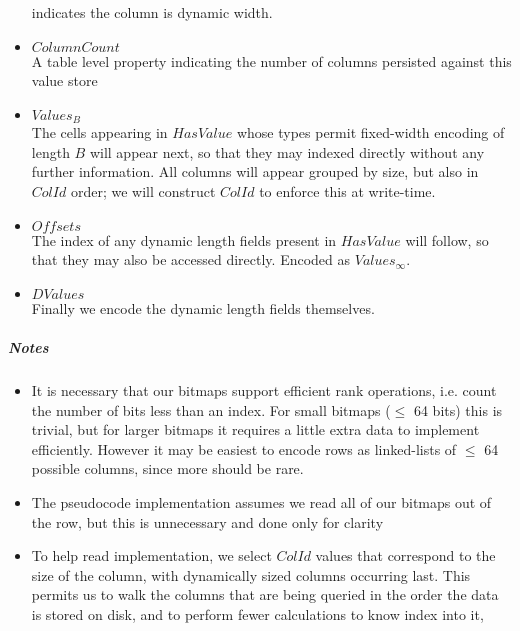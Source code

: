 \documentclass[fleqn]{article}
\begin{document}
\begin{itemize}
    indicates the column is dynamic width.
  \item $ColumnCount$\\[2pt]
    A table level property indicating the number of columns persisted against this value store
  \item $Values_B$\\[2pt]
    The cells appearing in $HasValue$ whose types permit fixed-width encoding of length $B$ will appear next, 
    so that they may indexed directly without any further information. All columns will appear grouped by
    size, but also in $ColId$ order; we will construct $ColId$ to enforce this at write-time.
  \item $Offsets$\\[2pt]
    The index of any dynamic length fields present in $HasValue$ will follow, so that they may also be 
    accessed directly. Encoded as $Values_{\infty}$.
  \item $DValues$\\[2pt]
    Finally we encode the dynamic length fields themselves.
\end{itemize}

\subparagraph{Notes}
\begin{itemize}
 \item{} It is necessary that our bitmaps support efficient rank operations, i.e. count the number of bits
 less than an index. For small bitmaps ($\leq$ 64 bits) this is trivial, but for larger bitmaps
 it requires a little extra data to implement efficiently. However it may be easiest to encode rows
 as linked-lists of $\leq$ 64 possible columns, since more should be rare.
 \item{} The pseudocode implementation assumes we read all of our bitmaps out of the row, but this is unnecessary
 and done only for clarity 
 \item{} To help read implementation, we select $ColId$ values that correspond to the size of the column, with 
 dynamically sized columns occurring last. This permits us to walk the columns that are being queried in the order
 the data is stored on disk, and to perform fewer calculations to know index into it, 
\end{itemize}
\end{document}

